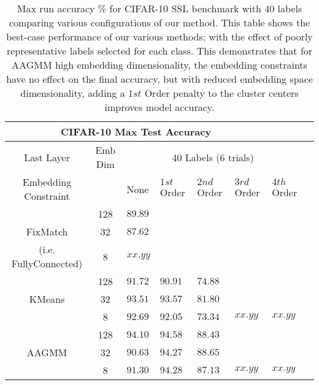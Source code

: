\documentclass[10pt,twocolumn,letterpaper]{article}
\begin{document}
\begin{table*}[ht!]
	\begin{tabularx}{\textwidth}{c|c|XXXXXX}
		\multicolumn{6}{c}{CIFAR-10 Max Test Accuracy} \\ \hline\hline
		Last Layer &   Emb Dim   & \multicolumn{5}{c}{40 Labels (6 trials)}            \\ 
		\hline
		Embedding Constraint  &  & None & $1st$ Order & $2nd$ Order & $3rd$ Order & $4th$ Order  \\ 
		\hline
		& 128  & $89.89$   &  &  &  &   \\
		FixMatch\cite{sohn2020fixmatch} & 32  & $87.62$     &  &  &  &   \\
		(i.e. FullyConnected) & 8  & $xx.yy$    &  &  &  &   \\
		\hline
		& 128  & $91.72$    & $90.91$   & $74.88$  &  &  \\
		KMeans & 32  & $93.51$     & $93.57$   & $81.80$   &  &  \\
		& 8  & $92.69$    & $92.05$  & $73.34$  & $xx.yy$  & $xx.yy$  \\
		\hline
		& 128  & $94.10$    & $94.58$   & $88.43$   &  &  \\
		AAGMM  & 32  & $90.63$    & $94.27$   & $88.65$   &  &  \\
		& 8  & $91.30$    & $94.28$   & $87.13$   & $xx.yy$  & $xx.yy$  \\
	\end{tabularx}
	\caption{Max run accuracy \% for CIFAR-10 SSL benchmark with 40 labels comparing various configurations of our method. This table shows the best-case performance of our various methods; with the effect of poorly representative labels selected for each class. This demonstrates that for AAGMM high embedding dimensionality, the embedding constraints have no effect on the final accuracy, but with reduced embedding space dimensionality, adding a $1st$ Order penalty to the cluster centers improves model accuracy.}
	\label{table1.5}
\end{table*}
\end{document}
